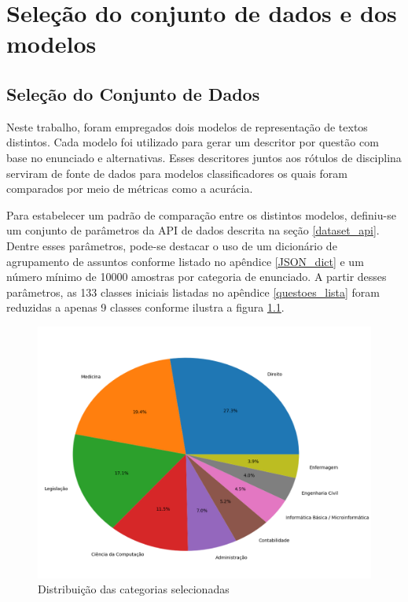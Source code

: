 \chapter{Seleção do conjunto de dados e dos modelos}
\label{chapter:implementacaoResultados}
\noindent

\section{Seleção do Conjunto de Dados}

Neste trabalho, foram empregados dois modelos de representação de textos distintos. Cada modelo foi utilizado para gerar um descritor por questão com base no enunciado e alternativas. Esses descritores juntos aos rótulos de disciplina serviram de fonte de dados para modelos classificadores os quais foram comparados por meio de métricas como a acurácia.

Para estabelecer um padrão de comparação entre os distintos modelos, definiu-se um conjunto de parâmetros da API de dados descrita na seção \ref{dataset_api}. Dentre esses parâmetros, pode-se destacar o uso de um dicionário de agrupamento de assuntos conforme listado no apêndice \ref{JSON_dict} e um número mínimo de 10000 amostras por categoria de enunciado. A partir desses parâmetros, as 133 classes iniciais listadas no apêndice \ref{questoes_lista} foram reduzidas a apenas 9 classes conforme ilustra a figura \ref{fig:pie_labels_graph}.

\begin{figure}[!ht]
	\centering
	\includegraphics[width=1.0\textwidth]{figures/pie_graph.png}
	\caption{Distribuição das categorias selecionadas}
	\label{fig:pie_labels_graph}
\end{figure}

